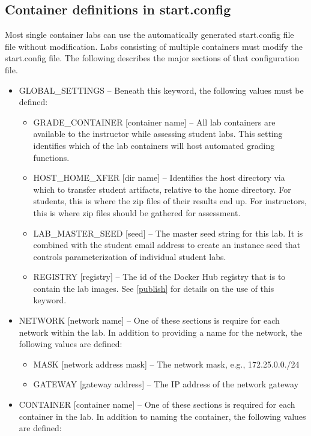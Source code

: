 \documentclass[12pt]{article}
\begin{document}
\subsection{Container definitions in start.config}
\label{start.config}
Most single container labs can use the automatically generated start.config file file
without modification.  Labs consisting of multiple containers must modify the start.config 
file.  The following describes the major sections of that configuration file.
\begin{itemize}
\item GLOBAL\_SETTINGS -- Beneath this keyword, the following values must be defined:

\begin{itemize}
\item GRADE\_CONTAINER [container name] -- All lab containers are available to the instructor while assessing student labs.
This setting identifies which of the lab containers will host automated grading functions.
\item HOST\_HOME\_XFER [dir name] --  Identifies the host directory via which to transfer student artifacts, relative to 
the home directory.  For students, this is where the zip files of their results end up.  For instructors, this is
where zip files should be gathered for assessment.
\item LAB\_MASTER\_SEED [seed] -- The master seed string for this lab.  It is combined with the student email
address to create an instance seed that controls parameterization of individual student labs.
\item REGISTRY [registry] -- The id of the Docker Hub registry that is to contain the lab images.
See \ref{publish} for details on the use of this keyword.
\end{itemize}

\item NETWORK [network name] -- One of these sections is require for each network within the lab.  In addition to
providing a name for the network, the following values are defined:

\begin{itemize}
\item MASK [network address mask] -- The network mask, e.g., 172.25.0.0./24
\item GATEWAY [gateway address] -- The IP address of the network gateway
\end{itemize}

\item CONTAINER [container name] -- One of these sections is required for each container in the lab.
In addition to naming the container, the following values are defined: 


\end{itemize}
\end{document}

